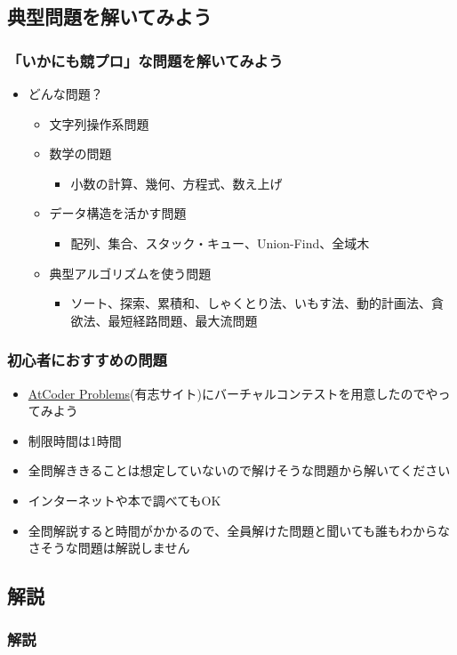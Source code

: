 \documentclass[t, aspectratio=169, dvipdfmx]{beamer}
\begin{document}
\subsection{典型問題を解いてみよう}
\begin{frame}
  \frametitle{「いかにも競プロ」な問題を解いてみよう}
  \begin{itemize}
    \item どんな問題？
    \begin{itemize}
      \item 文字列操作系問題
      \item 数学の問題
      \begin{itemize}
        \item 小数の計算、幾何、方程式、数え上げ
      \end{itemize}
      \item データ構造を活かす問題
      \begin{itemize}
        \item 配列、集合、スタック・キュー、Union-Find、全域木
      \end{itemize}
      \item 典型アルゴリズムを使う問題
      \begin{itemize}
        \item ソート、探索、累積和、しゃくとり法、いもす法、動的計画法、貪欲法、最短経路問題、最大流問題
      \end{itemize}
    \end{itemize}
  \end{itemize}
\end{frame}

\begin{frame}
  \frametitle{初心者におすすめの問題}
  \begin{itemize}
    \item \href{https://kenkoooo.com/atcoder}{AtCoder Problems}(有志サイト)にバーチャルコンテストを用意したのでやってみよう
    \item 制限時間は1時間
    \item 全問解ききることは想定していないので解けそうな問題から解いてください
    \item インターネットや本で調べてもOK
    \item 全問解説すると時間がかかるので、全員解けた問題と聞いても誰もわからなさそうな問題は解説しません
  \end{itemize}
\end{frame}

\subsection{解説}
\begin{frame}[c]
  \frametitle{解説}
\end{frame}
\end{document}
